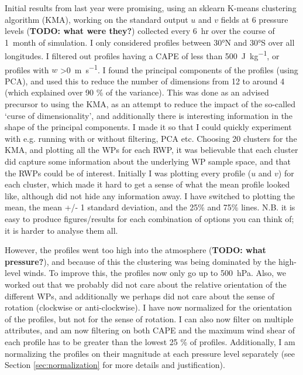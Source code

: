 \documentclass{article}
\newcommand\todo[1]{\textbf{TODO: #1}}
\begin{document}
Initial results from last year were promising, using an sklearn K-means clustering algorithm (KMA), working on the standard output $u$ and $v$ fields at 6 pressure levels (\todo{what were they?}) collected every \SI{6}{hr} over the course of \SI{1}{month} of simulation. I only considered profiles between \ang{30}N and \ang{30}S over all longitudes. I filtered out profiles having a CAPE of less than \SI{500}{J.kg^{-1}}, or profiles with $w$ \textgreater  \SI{0}{m.s^{-1}}. I found the principal components of the profiles (using PCA), and used this to reduce the number of dimensions from 12 to around 4 (which explained over 90 \% of the variance). This was done as an advised precursor to using the KMA, as an attempt to reduce the impact of the so-called `curse of dimensionality', and additionally there is interesting information in the shape of the principal components. I made it so that I could quickly experiment with e.g. running with or without filtering, PCA etc. Choosing 20 clusters for the KMA, and plotting all the WPs for each RWP, it was believable that each cluster did capture some information about the underlying WP sample space, and that the RWPs could be of interest. Initially I was plotting every profile ($u$ and $v$) for each cluster, which made it hard to get a sense of what the mean profile looked like, although did not hide any information away. I have switched to plotting the mean, the mean +/- 1 standard deviation, and the 25\% and 75\% lines. N.B. it is easy to produce figures/results for each combination of options you can think of; it is harder to analyse them all. 

However, the profiles went too high into the atmosphere (\todo{what pressure?}), and because of this the clustering was being dominated by the high-level winds. To improve this, the profiles now only go up to \SI{500}{hPa}. Also, we worked out that we probably did not care about the relative orientation of the different WPs, and additionally we perhaps did not care about the sense of rotation (clockwise or anti-clockwise). I have now normalized for the orientation of the profiles, but not for the sense of rotation. I can also now filter on multiple attributes, and am now filtering on both CAPE and the maximum wind shear of each profile has to be greater than the lowest 25 \% of profiles. Additionally, I am normalizing the profiles on their magnitude at each pressure level separately (see Section \ref{sec:normalization} for more details and justification).
\end{document}
